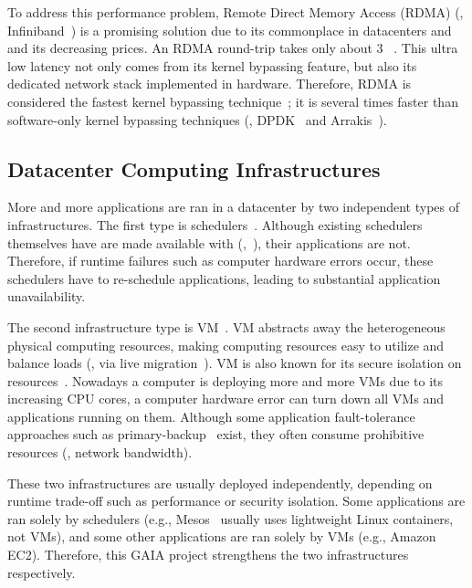 To address this \paxos performance problem, Remote Direct Memory Access (RDMA) 
(\eg, Infiniband~\cite{infiniband}) is a promising solution due to its 
commonplace in datacenters and and its decreasing prices. An RDMA round-trip 
takes only about 3 \us~\cite{pilaf:usenix14}. This ultra low latency not only 
comes from its kernel bypassing feature, but also its dedicated network stack 
implemented in hardware. Therefore, RDMA is considered the fastest kernel 
bypassing technique~\cite{herd:sigcomm14,pilaf:usenix14,dare:hpdc15}; it is 
several times faster than software-only kernel bypassing techniques (\eg, 
DPDK~\cite{dpdk} and Arrakis~\cite{arrakis:osdi14}).

\vspace{-.15in}\subsection{Datacenter Computing Infrastructures}
\label{sec:datacenter}\vspace{-.075in}

More and more applications are ran in a datacenter by two independent types of 
infrastructures. The first type is 
schedulers~\cite{borg:eurosys15,mesos:nsdi11,tupperware, yarn:socc13, 
autopilot:sosp07,quincy:sosp09,apollo:osdi14,fuxi:vldb14}. Although existing 
schedulers themselves have are made available with \paxos 
(\eg,~\cite{mesos:nsdi11}), their applications are not. Therefore, if runtime 
failures such as computer hardware errors occur, these schedulers have to 
re-schedule applications, leading to substantial application unavailability.

The second infrastructure type is VM~\cite{amazon:vpc, openstack, esx:osdi02, 
kvm, xen:sosp}. VM abstracts away the heterogeneous physical computing 
resources, making computing resources easy to utilize and balance loads (\eg, 
via live migration~\cite{vmotion:atc05,xen:migration:nsdi05}). VM is also known 
for its secure isolation on resources~\cite{xen:sosp,kvm,vmware:sugerman}. 
Nowadays a computer is deploying more and more VMs due to its increasing CPU 
cores, a computer hardware error can turn down all VMs and applications running 
on them. Although some application fault-tolerance approaches such as 
primary-backup~\cite{remus:nsdi08} exist, they often consume prohibitive 
resources (\eg, network bandwidth).

These two infrastructures are usually deployed independently, depending on 
runtime trade-off such as performance or security isolation. Some applications 
are ran solely by schedulers (e.g., Mesos~\cite{mesos:nsdi11} usually uses 
lightweight Linux containers, not VMs), and some other applications are ran 
solely by VMs (e.g., Amazon EC2). Therefore, this GAIA project strengthens the 
two infrastructures respectively.


